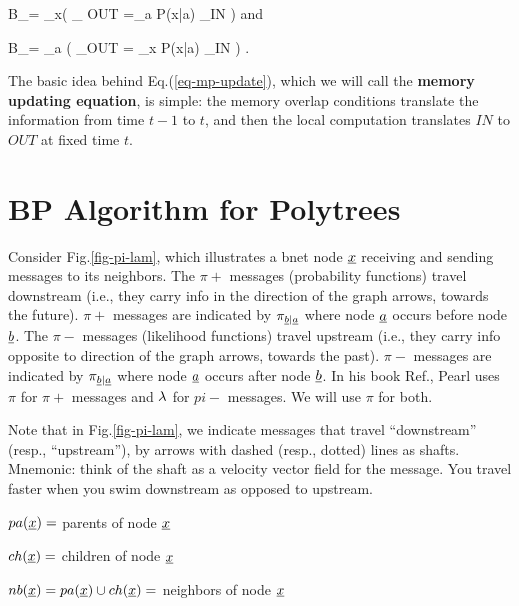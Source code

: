 \beq
B_\pi=
\prod_{x}\indi\left(
_
{OUT}
=\sum_a P(x|a)
_{IN}
\right)
\eeq
and

\beq
B_\pi=
\prod_{a}
\indi\left(
_{OUT}
=
\sum_x P(x|a)
_{IN}
\right)
\;.
\eeq

The basic idea behind Eq.(\ref{eq-mp-update}),
which we will call the
{\bf memory updating equation}, is simple:
the memory overlap conditions translate the information
from time $t-1$ to $t$, and
then the local computation translates
$IN$ to $OUT$ at fixed time $t$.




\section{BP Algorithm for Polytrees}


Consider Fig.\ref{fig-pi-lam},
which illustrates
a bnet node ${\underline{x}}$ receiving and sending
messages to its neighbors.
The $\pi+$  messages
(probability functions)
travel downstream (i.e.,
they carry info
in the direction
of the graph arrows, towards the future).
$\pi+$ messages are indicated by
$\pi_{{\underline{b}}|{\underline{a}}}$ where node ${\underline{a}}$ occurs
before node ${\underline{b}}$.
The $\pi-$  messages
(likelihood functions) travel
upstream (i.e., they
carry info opposite to
direction of the graph arrows,
towards the past).
$\pi-$ messages are indicated by
$\pi_{{\underline{b}}|{\underline{a}}}$ where node ${\underline{a}}$ occurs
after node ${\underline{b}}$. In his book Ref.\cite{pearl-1988book}, Pearl uses
$\pi$ for $\pi+$
messages and $\lambda$ for $pi-$ messages.
We will use $\pi$ for both.


Note that in Fig.\ref{fig-pi-lam},
we indicate
messages that travel
\enquote{downstream}
(resp., \enquote{upstream}), by
arrows with dashed (resp., dotted)
 lines as shafts.
Mnemonic: think of the shaft as a
 velocity vector field
for the message.
You travel faster when
you swim downstream as opposed
to upstream.

$pa({\underline{x}})=$ parents of node ${\underline{x}}$

$ch({\underline{x}})=$ children of node ${\underline{x}}$

$nb({\underline{x}})=pa({\underline{x}})\cup ch({\underline{x}})=$
neighbors of node ${\underline{x}}$



